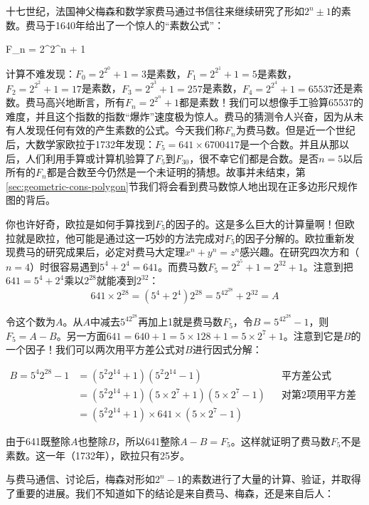 \documentclass[b5paper]{ctexart}
\begin{document}
十七世纪，法国神父梅森和数学家费马通过书信往来继续研究了形如$2^n \pm 1$的素数。费马于1640年给出了一个惊人的“素数公式”：

\be
F_n = 2^{2^n} + 1
\ee

计算不难发现：$F_0 = 2^{2^0} + 1 = 3$是素数，$F_1 = 2^{2^1} + 1 = 5$是素数，$F_2 = 2^{2^2} + 1 = 17$是素数，$F_3 = 2^{2^3} + 1 = 257$是素数，$F_4 = 2^{2^4} + 1 = 65537$还是素数。费马高兴地断言，所有$F_n = 2^{2^n} + 1$都是素数！我们可以想像手工验算65537的难度，并且这个指数的指数“爆炸”速度极为惊人。费马的猜测令人兴奋，因为从未有人发现任何有效的产生素数的公式。今天我们称$F_n$为费马数。但是近一个世纪后，大数学家欧拉于1732年发现：$F_5= 641 \times 6700417$是一个合数。并且从那以后，人们利用手算或计算机验算了$F_5$到$F_{30}$，很不幸它们都是合数。是否$n = 5$以后所有的$F_n$都是合数至今仍然是一个未证明的猜想。故事并未结束，第\ref{sec:geometric-cons-polygon}节我们将会看到费马数惊人地出现在正多边形尺规作图的背后。

\begin{mdframed}
你也许好奇，欧拉是如何手算找到$F_5$的因子的。这是多么巨大的计算量啊！但欧拉就是欧拉，他可能是通过这一巧妙的方法完成对$F_5$的因子分解的。欧拉重新发现费马的研究成果后，必定对费马大定理$x^n + y^n = z^n$感兴趣。在研究四次方和（$n = 4$）时很容易遇到$5^4 + 2^4= 641$。而费马数$F_5 = 2^{2^5} + 1 = 2^{32} + 1$。注意到把$641 = 5^4 + 2^4$乘以$2^{28}$就能凑到$2^{32}$：
\[
641 \times 2^{28} = (5^4 + 2^4)2^{28} = 5^42^{28} + 2^{32} = A
\]

令这个数为$A$。从$A$中减去$5^42^{28}$再加上1就是费马数$F_5$，令$B = 5^42^{28} - 1$，则$F_5 = A - B$。另一方面$641 = 640 + 1 = 5 \times 128 + 1 = 5 \times 2^{7} + 1$。注意到它是$B$的一个因子！我们可以两次用平方差公式对$B$进行因式分解：

\begin{align*}
B = 5^4 2^{28} - 1 &= (5^2 2^{14} + 1)(5^2 2^{14} - 1) && \text{平方差公式} \\
  &= (5^2 2^{14} + 1)(5 \times 2^7 + 1)(5 \times 2^7 - 1) && \text{对第2项用平方差公式} \\
  &= (5^2 2^{14} + 1) \times 641 \times (5 \times 2^7 - 1)
\end{align*}

由于641既整除$A$也整除$B$，所以641整除$A - B = F_5$。这样就证明了费马数$F_5$不是素数。这一年（1732年），欧拉只有25岁。
\end{mdframed}

与费马通信、讨论后，梅森对形如$2^n - 1$的素数进行了大量的计算、验证，并取得了重要的进展。我们不知道如下的结论是来自费马、梅森，还是来自后人：
\end{document}
